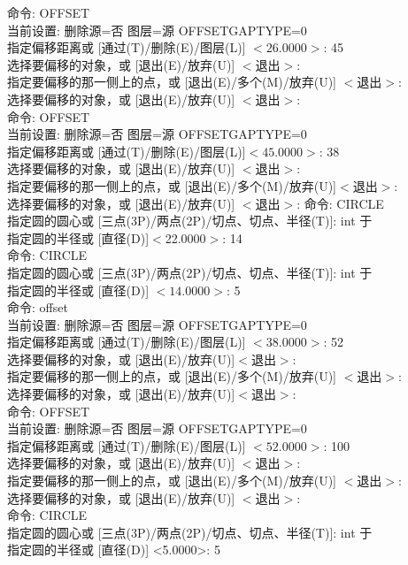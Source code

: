 命令: OFFSET\\
当前设置: 删除源=否  图层=源  OFFSETGAPTYPE=0\\
指定偏移距离或 [通过(T)/删除(E)/图层(L)] $<26.0000>$:  45\\
选择要偏移的对象，或 [退出(E)/放弃(U)] $<$退出$>$:\\
指定要偏移的那一侧上的点，或 [退出(E)/多个(M)/放弃(U)] $<$退出$>$:\\
选择要偏移的对象，或 [退出(E)/放弃(U)] $<$退出$>$:\\
命令:  OFFSET\\
当前设置: 删除源=否  图层=源  OFFSETGAPTYPE=0\\
指定偏移距离或 [通过(T)/删除(E)/图层(L)]$ <45.0000>$:  38\\
选择要偏移的对象，或 [退出(E)/放弃(U)] $<$退出$>$:\\
指定要偏移的那一侧上的点，或 [退出(E)/多个(M)/放弃(U)]$ <$退出$>$:\\
选择要偏移的对象，或 [退出(E)/放弃(U)] $<$退出$>$:
命令: CIRCLE \\
指定圆的圆心或 [三点(3P)/两点(2P)/切点、切点、半径(T)]: int 于\\
指定圆的半径或 [直径(D)]$ <$22.0000$>$: 14\\
命令:  CIRCLE \\
指定圆的圆心或 [三点(3P)/两点(2P)/切点、切点、半径(T)]: int 于\\
指定圆的半径或 [直径(D)] $<14.0000>$: 5\\

命令: offset\\
当前设置: 删除源=否  图层=源  OFFSETGAPTYPE=0\\
指定偏移距离或 [通过(T)/删除(E)/图层(L)] $<38.0000>$:  52\\
选择要偏移的对象，或 [退出(E)/放弃(U)]$ <$退出$>$:\\
指定要偏移的那一侧上的点，或 [退出(E)/多个(M)/放弃(U)] $<$退出$>$:\\
选择要偏移的对象，或 [退出(E)/放弃(U)]$ <$退出$>$:\\
命令:  OFFSET\\
当前设置: 删除源=否  图层=源  OFFSETGAPTYPE=0\\
指定偏移距离或 [通过(T)/删除(E)/图层(L)] $<52.0000>$:  100\\
选择要偏移的对象，或 [退出(E)/放弃(U)] $<$退出$>$:\\
指定要偏移的那一侧上的点，或 [退出(E)/多个(M)/放弃(U)] $<$退出$>:$\\
选择要偏移的对象，或 [退出(E)/放弃(U)] $<$退出$>$:\\
命令: CIRCLE\\
指定圆的圆心或 [三点(3P)/两点(2P)/切点、切点、半径(T)]: int 于\\
指定圆的半径或 [直径(D)] <5.0000>: 5\\

